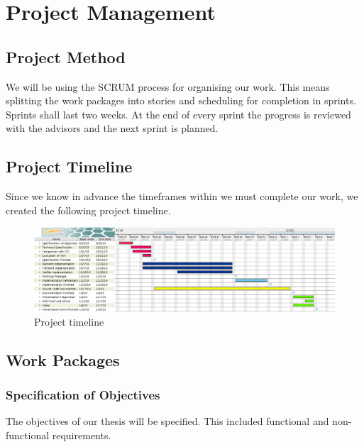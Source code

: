 \chapter{Project Management}
\label{ch:projectmanagement}

\section{Project Method}
\label{section:projectmethod}
We will be using the SCRUM process for organising our work.
This means splitting the work packages into stories and scheduling for completion in sprints.
Sprints shall last two weeks. At the end of every sprint the progress is reviewed with the advisors and the next sprint is planned.

\section{Project Timeline}
\label{section:projecttimeline}
Since we know in advance the timeframes within we must complete our work, we created the following project timeline.

\begin{landscape}
\vspace*{\fill}
	\begin{figure}[H]
	\begin{center}
		\includegraphics[scale=0.5]{images/Projectplan.png}
		\caption{Project timeline}
		\label{fig:projecttimeline}
	\end{center}
	\end{figure}
\vspace*{\fill}
\end{landscape}

\section{Work Packages}
\label{section:workpackages}

\subsection{Specification of Objectives}
The objectives of our thesis will be specified.
This included functional and non-functional requirements.

